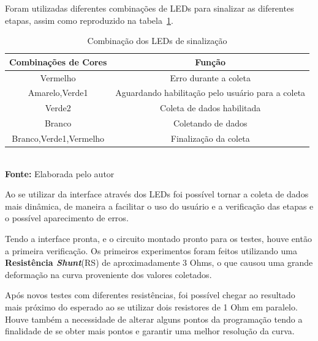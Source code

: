 Foram utilizadas diferentes combinações de LEDs para sinalizar as diferentes etapas, assim como  reproduzido na tabela~\ref{tab:LEDS}.

\FloatBarrier
\begin{table}[!htbp]
	\centering
	\caption{Combinação dos LEDs de sinalização}
	\begin{tabular}{ c | c }
		\hline
		\textbf{Combinações de Cores} & \textbf{Função}                                   \\ \hline
		Vermelho                      & Erro durante a coleta                             \\ \hline
		Amarelo,Verde1                & Aguardando habilitação pelo usuário para a coleta \\ \hline
		Verde2                        & Coleta de dados habilitada                        \\ \hline
		Branco                        & Coletando de dados                                \\ \hline
		Branco,Verde1,Vermelho        & Finalização da coleta                             \\ \hline
	\end{tabular}
	\\ \vspace{0.2cm}
	\textbf{Fonte:} Elaborada pelo autor
	\label{tab:LEDS}
\end{table}
\FloatBarrier

Ao se utilizar da interface através dos LEDs foi possível tornar a coleta de dados mais dinâmica, de maneira a facilitar o uso do usuário e a verificação das etapas e o possível aparecimento de erros.

Tendo a interface pronta, e o circuito montado pronto para os testes, houve então a primeira verificação. Os primeiros experimentos foram feitos utilizando uma \textbf{Resistência \textit{Shunt}}(RS) de aproximadamente 3 Ohms, o que causou uma grande deformação na curva proveniente dos valores coletados.

Após novos testes com diferentes resistências, foi  possível chegar ao resultado mais próximo do esperado ao se utilizar dois resistores de 1 Ohm em paralelo. Houve também a necessidade de alterar alguns pontos da programação tendo a finalidade de se obter mais pontos e garantir uma melhor resolução da curva.



